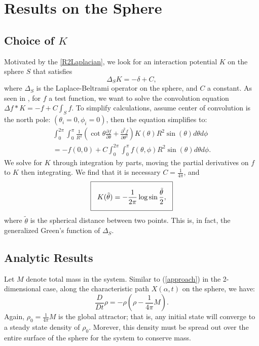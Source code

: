 \documentclass{article}
\newcommand{\p}{\partial}
\newcommand{\h}{\theta}
\newcommand{\hi}{\theta_i}
\begin{document}
\section{Results on the Sphere}
\subsection{Choice of $K$}
Motivated by the \ref{R2Laplacian}, we look for an interaction potential $K$ on the sphere $S$ that satisfies
\[
\Delta_S K = -\delta + C,
\]
where $\Delta_S$ is the Laplace-Beltrami operator on the sphere, and $C$ a constant. As seen in \cite{howard}, for $f$ a test function, we want to solve the convolution equation $\Delta f * K = -f + C \int_S f$. To simplify calculations, assume center of convolution is the north pole: $(\hi = 0, \phi_i = 0)$, then the equation simplifies to: 
\begin{align*}
\int_{0}^{2\pi} \int_{0}^{\pi} \frac{1}{R^2} \left(  \cot{\h} \frac{\p f}{\p \h} + \frac{\p^2 f}{\p\h^2} \right)K(\h) R^2 \sin(\h) d\h d\phi\\
= - f(0,0) + C \int_{0}^{2\pi} \int_{0}^{\pi} f(\h,\phi) R^2 \sin(\h) d\h d\phi.
\end{align*}
We solve for $K$ through integration by parts, moving the partial derivatives on $f$ to $K$ then integrating. We find that it is necessary $C = \frac{1}{4\pi}$, and
\[
\setlength{\fboxsep}{3\fboxsep}\boxed{ K(\tilde{\h}) = -\frac{1}{2\pi} \log{ \sin{ \frac{\tilde{\h}}{2} } } ,}
\]
where $\tilde{\h}$ is the spherical distance between two points. This is, in fact, the generalized Green's function of $\Delta_S$.
\subsection{Analytic Results}
Let $M$ denote total mass in the system. Similar to (\ref{approach}) in the 2-dimensional case, along the characteristic path $X(\alpha,t)$ on the sphere, we have:
\begin{equation}
\label{sphere_approach}
\frac{D}{Dt} \rho =-\rho (\rho - \frac{1}{4\pi}M).
\end{equation}
Again, $\rho_0 = \frac{1}{4\pi}M$ is the global attractor; that is, any initial state will converge to a steady state density of $\rho_0$. Morever, this density must be spread out over the entire surface of the sphere for the system to conserve mass.
\end{document}
